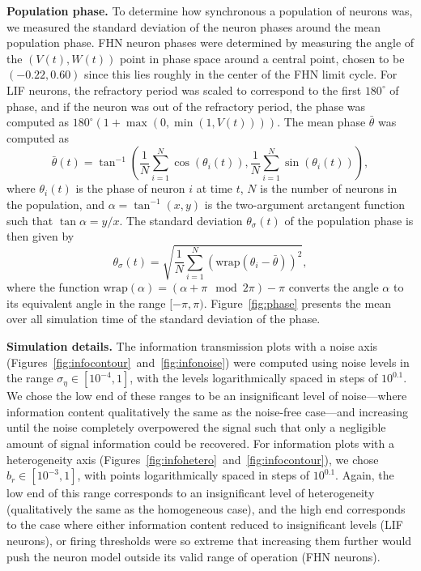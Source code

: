 \documentclass[letterpaper,11pt]{article}
\begin{document}
\textbf{Population phase.} To determine how synchronous a population of neurons was, we measured the standard deviation of the neuron phases around the mean population phase. FHN neuron phases were determined by measuring the angle of the $(V(t),W(t))$ point in phase space around a central point, chosen to be $(-0.22,0.60)$ since this lies roughly in the center of the FHN limit cycle. For LIF neurons, the refractory period was scaled to correspond to the first $180^\circ$ of phase, and if the neuron was out of the refractory period, the phase was computed as $180^\circ ( 1 + \max(0,\min(1,V(t))) )$. The mean phase $\bar\theta$ was computed as
\begin{equation}
  \bar\theta(t) = \tan^{-1} \left(
  \frac{1}{N}\sum\limits_{i=1}^N \cos\left(\theta_i(t)\right),
  \frac{1}{N}\sum\limits_{i=1}^N \sin\left(\theta_i(t)\right) \right),
\end{equation}
where $\theta_i(t)$ is the phase of neuron $i$ at time $t$, $N$ is the number of neurons in the population, and $\alpha = \tan^{-1}(x,y)$ is the two-argument arctangent function such that $\tan\alpha = y/x$. The standard deviation $\theta_\sigma(t)$ of the population phase is then given by
\begin{equation}
  \theta_\sigma(t) = \sqrt{ \frac{1}{N} \sum\limits_{i=1}^N (\mathrm{wrap}(\theta_i - \bar\theta))^2 },
\end{equation}
where the function $\mathrm{wrap}(\alpha) = (\alpha + \pi \mod 2\pi) - \pi$ converts the angle $\alpha$ to its equivalent angle in the range $[-\pi,\pi)$. Figure~\ref{fig:phase} presents the mean over all simulation time of the standard deviation of the phase.

\textbf{Simulation details.} The information transmission plots with a noise axis (Figures~\ref{fig:infocontour}~and~\ref{fig:infonoise}) were computed using noise levels in the range $\sigma_\eta \in [10^{-4},1]$, with the levels logarithmically spaced in steps of $10^{0.1}$. We chose the low end of these ranges to be an insignificant level of noise---where information content qualitatively the same as the noise-free case---and increasing until the noise completely overpowered the signal such that only a negligible amount of signal information could be recovered. For information plots with a heterogeneity axis (Figures~\ref{fig:infohetero}~and~\ref{fig:infocontour}), we chose $b_r \in [10^{-3}, 1]$, with points logarithmically spaced in steps of $10^{0.1}$. Again, the low end of this range corresponds to an insignificant level of heterogeneity (qualitatively the same as the homogeneous case), and the high end corresponds to the case where either information content reduced to insignificant levels (LIF neurons), or firing thresholds were so extreme that increasing them further would push the neuron model outside its valid range of operation (FHN neurons).
\end{document}
